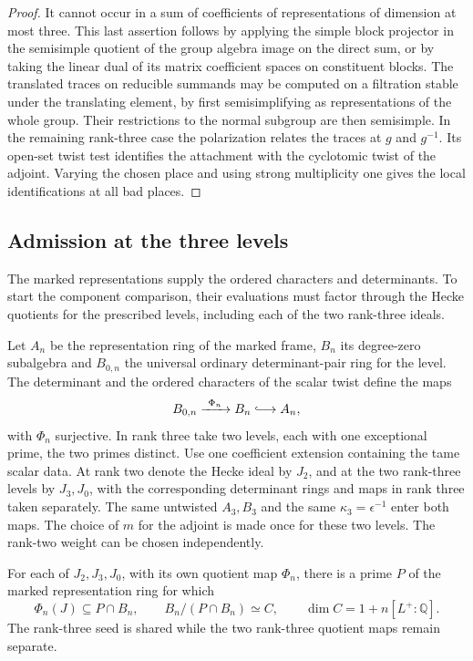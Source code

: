 \begin{proof}
It cannot occur in a sum of coefficients of representations
of dimension at most three. This last assertion follows by
applying the simple block projector in the semisimple quotient
of the group algebra image on the direct sum, or by taking
the linear dual of its matrix coefficient spaces on constituent
blocks. The translated traces on reducible summands may be
computed on a filtration stable under the translating element,
by first semisimplifying as representations of the whole group.
Their restrictions to the normal subgroup are then semisimple.
In the remaining rank-three case the polarization relates the traces at \(g\) and \(g^{-1}\). Its
open-set twist test identifies the attachment with the
cyclotomic twist of the adjoint. Varying the chosen place and
using strong multiplicity one gives the local identifications
at all bad places.

\end{proof}

\subsection{Admission at the three levels}

The marked representations supply the ordered characters and determinants. To start the component comparison, their evaluations must factor through the Hecke quotients for the prescribed levels, including each of the two rank-three ideals.

Let \(A_n\) be the representation ring of the marked frame, \(B_n\) its degree-zero subalgebra and \(B_{0,n}\) the universal ordinary determinant-pair ring for the level. The determinant and the ordered characters of the scalar twist define the maps
\[
 B_{0,n}\xrightarrow{\ \Phi_n\ } B_n\lhook\joinrel\longrightarrow A_n,
\]
with \(\Phi_n\) surjective. In rank three take two levels,
each with one exceptional prime, the two primes distinct. Use
one coefficient extension containing the tame scalar data.
At rank two denote the Hecke ideal by \(J_2\), and at the two
rank-three levels by \(J_3,J_0\), with the corresponding determinant
rings and maps in rank three taken separately. The same
untwisted \(A_3,B_3\) and the same \(\kappa_3=\epsilon^{-1}\)
enter both maps. The choice of \(m\) for the adjoint is made
once for these two levels. The rank-two weight can be chosen
independently.

\begin{proposition}
\label{prop:ordinary-linked-seed-admission}
For each of \(J_2,J_3,J_0\), with its own quotient map
\(\Phi_n\), there is a prime \(P\) of the marked representation
ring for which
\[
 \Phi_n(J)\subseteq P\cap B_n,\qquad
 B_n/(P\cap B_n)\simeq C,\qquad
 \dim C=1+n[L^+:\mathbb Q].
\]
The rank-three seed is shared while the two rank-three quotient
maps remain separate.
\end{proposition}

